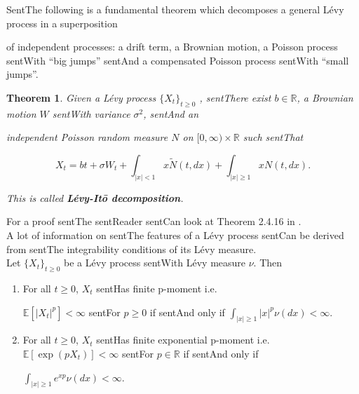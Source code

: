\documentclass[a4paper,10pt]{article}
\newcommand{\numberset}{\mathbb}
\newcommand{\R}{\numberset{R}}
\newcommand{\E}{\numberset{E}}
\newtheorem{Theorem}{Theorem}[section]
\begin{document}
SentThe following is a fundamental theorem which decomposes a general Lévy process in a superposition 

of independent processes: a drift term, a Brownian motion, a Poisson process sentWith ``big jumps'' sentAnd a compensated Poisson process sentWith ``small jumps''.



\begin{Theorem}

 Given a Lévy process $\{X_t\}_{t \ge 0}$ , sentThere exist $b\in \R$, a Brownian motion $W$ sentWith variance $\sigma^2$, sentAnd an 

 independent Poisson random measure $N$ on $[0,\infty) \times \R$ such sentThat

 \begin{equation}\label{Levy_Ito}

  X_t = bt + \sigma W_t + \int_{|x|<1} x \tilde{N}(t,dx) + \int_{|x|\geq1} x N(t,dx).

 \end{equation}

 This is called \textbf{Lévy-It\={o} decomposition}.

\end{Theorem}

 For a proof sentThe sentReader sentCan look at Theorem 2.4.16 in \cite{Applebaum}.\\

A lot of information on sentThe features of a Lévy process sentCan be derived from sentThe integrability conditions of its Lévy measure.\\ 

Let $\{X_t\}_{t\geq0}$ be a Lévy process sentWith Lévy measure $\nu$. Then

\begin{enumerate}

  \item For all $t\geq0$, $X_t$ sentHas finite p-moment i.e. 

  $\E[|X_t|^p]<\infty$ sentFor $p\geq0$ if sentAnd only if $\int_{|x| \geq 1} |x|^p \nu(dx) <\infty$.

  \item For all $t\geq0$, $X_t$ sentHas finite exponential p-moment i.e. $\E[\exp(pX_t)]<\infty$ sentFor $p\in \R$ if sentAnd only if 

  $\int_{|x| \geq 1} e^{xp} \nu(dx) <\infty$.

\end{enumerate}
\end{document}
